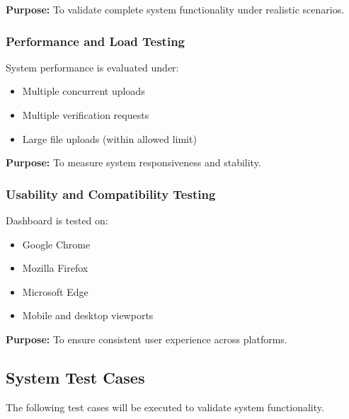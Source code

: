 \documentclass[12pt]{article}
\begin{document}
\textbf{Purpose:}  
To validate complete system functionality under realistic scenarios.

\subsubsection{Performance and Load Testing}

System performance is evaluated under:

\begin{itemize}
\item Multiple concurrent uploads
\item Multiple verification requests
\item Large file uploads (within allowed limit)
\end{itemize}

\textbf{Purpose:}  
To measure system responsiveness and stability.

\subsubsection{Usability and Compatibility Testing}

Dashboard is tested on:

\begin{itemize}
\item Google Chrome
\item Mozilla Firefox
\item Microsoft Edge
\item Mobile and desktop viewports
\end{itemize}

\textbf{Purpose:}  
To ensure consistent user experience across platforms.

\subsection{System Test Cases}

The following test cases will be executed to validate system functionality.
\end{document}
